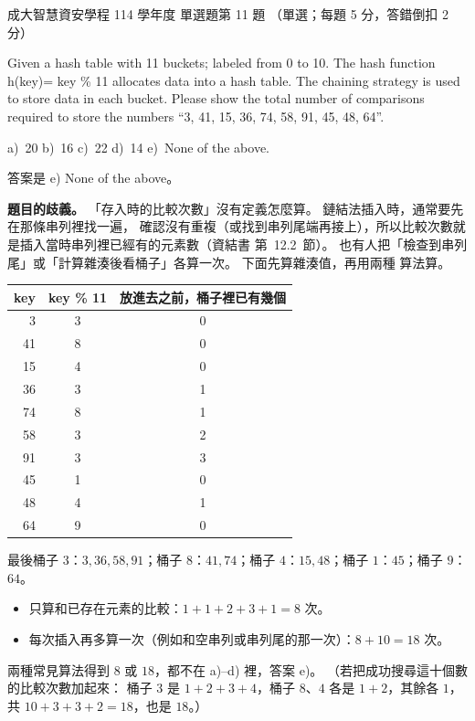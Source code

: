 \begin{pastexam}[label={px:ncku-114-isec-ds-11}]{成大智慧資安學程 114 學年度 單選題第 11 題}
（單選；每題 5 分，答錯倒扣 2 分）

Given a hash table with 11 buckets; labeled from 0 to 10. The hash function h(key)= key \% 11 allocates
data into a hash table. The chaining strategy is used to store data in each bucket. Please show the total
number of comparisons required to store the numbers ``3, 41, 15, 36, 74, 58, 91, 45, 48, 64''.

a)~20 \qquad b)~16 \qquad c)~22 \qquad d)~14 \qquad e)~None of the above.
\end{pastexam}

\begin{pastsoln}
答案是 e) None of the above。

\textbf{題目的歧義。} 「存入時的比較次數」沒有定義怎麼算。 鏈結法插入時，通常要先在那條串列裡找一遍，
確認沒有重複（或找到串列尾端再接上），所以比較次數就是插入當時串列裡已經有的元素數（資結書
第~12.2~節）。 也有人把「檢查到串列尾」或「計算雜湊後看桶子」各算一次。 下面先算雜湊值，再用兩種
算法算。

\begin{center}
\small
\begin{tabular}{rcc}
\toprule
key & key \% 11 & 放進去之前，桶子裡已有幾個 \\
\midrule
3 & 3 & 0 \\
41 & 8 & 0 \\
15 & 4 & 0 \\
36 & 3 & 1 \\
74 & 8 & 1 \\
58 & 3 & 2 \\
91 & 3 & 3 \\
45 & 1 & 0 \\
48 & 4 & 1 \\
64 & 9 & 0 \\
\bottomrule
\end{tabular}
\end{center}
最後桶子 $3$：$3, 36, 58, 91$；桶子 $8$：$41, 74$；桶子 $4$：$15, 48$；桶子 $1$：$45$；桶子 $9$：$64$。
\begin{itemize}
\item 只算和已存在元素的比較：$1 + 1 + 2 + 3 + 1 = 8$ 次。
\item 每次插入再多算一次（例如和空串列或串列尾的那一次）：$8 + 10 = 18$ 次。
\end{itemize}
兩種常見算法得到 $8$ 或 $18$，都不在 a)--d) 裡，答案 e)。 （若把成功搜尋這十個數的比較次數加起來：
桶子 $3$ 是 $1 + 2 + 3 + 4$，桶子 $8$、$4$ 各是 $1 + 2$，其餘各 $1$，共 $10 + 3 + 3 + 2 = 18$，也是 $18$。）
\end{pastsoln}
